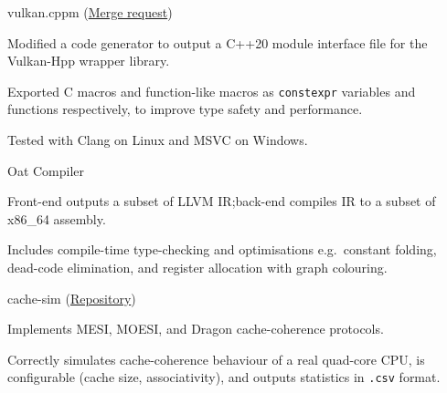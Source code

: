 \begin{cventries}
	{vulkan.cppm \footnotesize{(\href{https://github.com/KhronosGroup/Vulkan-Hpp/pull/1582}{Merge request})}} %
	{} %
	{} %
	{
		\begin{cvitems} %
			\item Modified a code generator to output a C++20 module interface file for the Vulkan-Hpp wrapper library.
			\item Exported C macros and function-like macros as \texttt{constexpr} variables and functions respectively, to improve type safety and performance.
			\item Tested with Clang on Linux and MSVC on Windows.
		\end{cvitems}
	}

	{Oat Compiler} %
	{} %
	{} %
	{
		\begin{cvitems} %
			\item Front-end outputs a subset of LLVM IR;\@ back-end compiles IR to a subset of x86\_64 assembly.
			\item Includes compile-time type-checking and optimisations e.g.\ constant folding, dead-code elimination, and register allocation with graph colouring.
		\end{cvitems}
	}


	{cache-sim \footnotesize(\href{https://github.com/sharadhr/cs4223-cache-sim}{Repository})} %
	{} %
	{} %
	{
		\begin{cvitems} %
			\item Implements MESI, MOESI, and Dragon cache-coherence protocols.
			\item Correctly simulates cache-coherence behaviour of a real quad-core CPU, is configurable (cache size, associativity), and outputs statistics in \texttt{.csv} format.
		\end{cvitems}
	}


\end{cventries}
